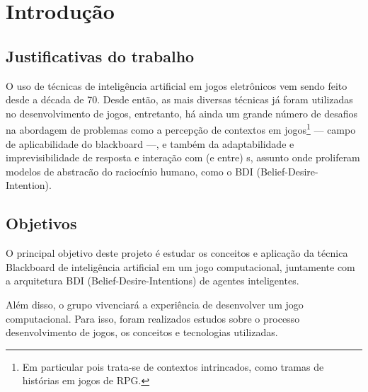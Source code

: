 \chapter{Introdução}


\section{Justificativas do trabalho}
O uso de técnicas de inteligência artificial em jogos eletrônicos vem sendo feito desde a década de 70. Desde então, as mais diversas técnicas já foram utilizadas no desenvolvimento de jogos,  entretanto, há ainda um grande número de desafios na abordagem de problemas como a percepção de contextos em jogos\footnote{Em particular pois trata-se de contextos intrincados, como tramas de histórias em jogos de RPG.} --- campo de aplicabilidade do blackboard ---, e também da adaptabilidade e imprevisibilidade de resposta e interação com (e entre) \npc{}s, assunto onde proliferam modelos de abstracão do raciocínio humano, como o BDI (Belief-Desire-Intention).

\section{Objetivos}
O principal objetivo deste projeto é estudar os conceitos e aplicação da técnica Blackboard de inteligência artificial em um jogo computacional, juntamente com a arquitetura BDI (Belief-Desire-Intentions) de agentes inteligentes. 

Além disso, o grupo vivenciará a experiência de desenvolver um jogo computacional.
Para isso, foram realizados estudos sobre o processo desenvolvimento de jogos, os conceitos e tecnologias utilizadas.
